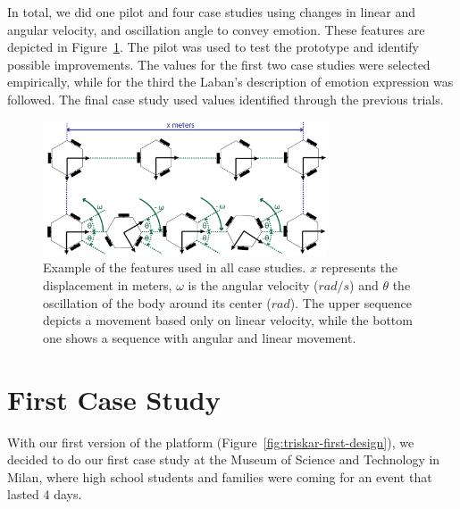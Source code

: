 In total, we did one pilot and four case studies using changes in linear and angular velocity, and oscillation angle to convey emotion. These features are depicted in Figure~\ref{fig:features}. The pilot was used to test the prototype and identify possible improvements. The values for the first two case studies were selected empirically, while for the third the Laban's description of emotion expression was followed. The final case study used values identified through the previous trials. 
\begin{figure}
	\centering
	\includegraphics[width=0.75\textwidth]{./Images/ExampleMovement.png}
	\caption{Example of the features used in all case studies. $x$ represents the displacement in meters, $\omega$ is the angular velocity ($rad/s$) and $\theta$ the oscillation of the body around its center ($rad$). The upper sequence depicts a movement based only on linear velocity, while the bottom one shows a sequence with angular and linear movement.}
	\label{fig:features}
\end{figure} 
\section{First Case Study}
With our first version of the platform (Figure~\ref{fig:triskar-first-design}), we decided to do our first case study at the Museum of Science and Technology in Milan, where high school students and families were coming for an event that lasted 4 days. 
